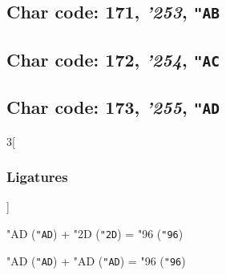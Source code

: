 \documentclass{article}
\newlength{\maxcharwidth}
\begin{document}
\subsection{Char code: 171, {\it'253}, {\tt"AB}}
\label{char_171}


\subsection{Char code: 172, {\it'254}, {\tt"AC}}
\label{char_172}


\subsection{Char code: 173, {\it'255}, {\tt"AD}}
\label{char_173}


\begin{multicols}{3}[\subsubsection{Ligatures}]

{\testfont\char"AD\noboundary} ({\tt"AD}) + {\testfont\char"2D\noboundary} ({\tt"2D}) = {\testfont\char"96\noboundary} ({\tt"96}) 

{\testfont\char"AD\noboundary} ({\tt"AD}) + {\testfont\char"AD\noboundary} ({\tt"AD}) = {\testfont\char"96\noboundary} ({\tt"96}) 

\end{multicols}
\end{document}
